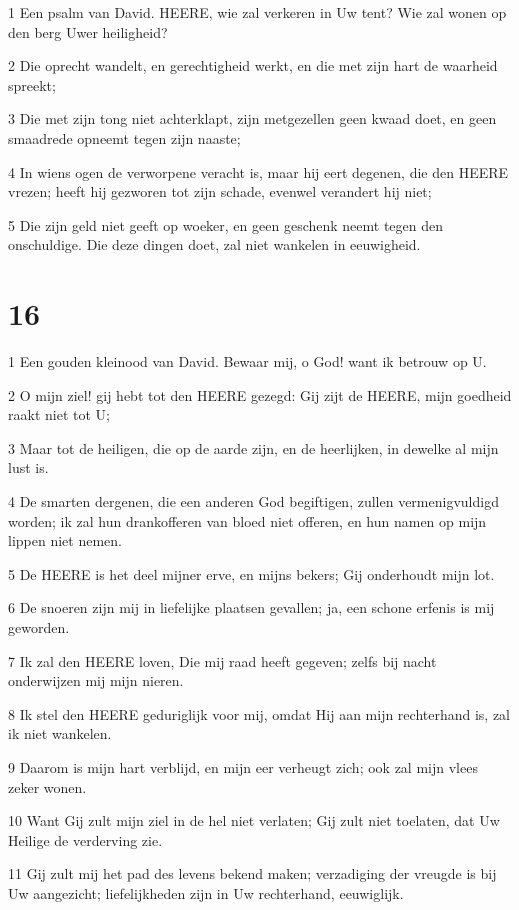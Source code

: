 \par 1 Een psalm van David. HEERE, wie zal verkeren in Uw tent? Wie zal wonen op den berg Uwer heiligheid?
\par 2 Die oprecht wandelt, en gerechtigheid werkt, en die met zijn hart de waarheid spreekt;
\par 3 Die met zijn tong niet achterklapt, zijn metgezellen geen kwaad doet, en geen smaadrede opneemt tegen zijn naaste;
\par 4 In wiens ogen de verworpene veracht is, maar hij eert degenen, die den HEERE vrezen; heeft hij gezworen tot zijn schade, evenwel verandert hij niet;
\par 5 Die zijn geld niet geeft op woeker, en geen geschenk neemt tegen den onschuldige. Die deze dingen doet, zal niet wankelen in eeuwigheid.

\chapter{16}

\par 1 Een gouden kleinood van David. Bewaar mij, o God! want ik betrouw op U.
\par 2 O mijn ziel! gij hebt tot den HEERE gezegd: Gij zijt de HEERE, mijn goedheid raakt niet tot U;
\par 3 Maar tot de heiligen, die op de aarde zijn, en de heerlijken, in dewelke al mijn lust is.
\par 4 De smarten dergenen, die een anderen God begiftigen, zullen vermenigvuldigd worden; ik zal hun drankofferen van bloed niet offeren, en hun namen op mijn lippen niet nemen.
\par 5 De HEERE is het deel mijner erve, en mijns bekers; Gij onderhoudt mijn lot.
\par 6 De snoeren zijn mij in liefelijke plaatsen gevallen; ja, een schone erfenis is mij geworden.
\par 7 Ik zal den HEERE loven, Die mij raad heeft gegeven; zelfs bij nacht onderwijzen mij mijn nieren.
\par 8 Ik stel den HEERE geduriglijk voor mij, omdat Hij aan mijn rechterhand is, zal ik niet wankelen.
\par 9 Daarom is mijn hart verblijd, en mijn eer verheugt zich; ook zal mijn vlees zeker wonen.
\par 10 Want Gij zult mijn ziel in de hel niet verlaten; Gij zult niet toelaten, dat Uw Heilige de verderving zie.
\par 11 Gij zult mij het pad des levens bekend maken; verzadiging der vreugde is bij Uw aangezicht; liefelijkheden zijn in Uw rechterhand, eeuwiglijk.

